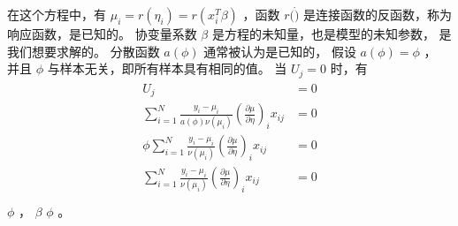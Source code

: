 \documentclass[letterpaper,10pt,english]{sphinxmanual}
\begin{document}
在这个方程中，有 \(\mu_i=r(\eta_i)=r(x_i^T \beta)\)
，函数 \(r(\dot)\) 是连接函数的反函数，称为响应函数，是已知的。
协变量系数 \(\beta\) 是方程的未知量，也是模型的未知参数，
是我们想要求解的。
分散函数 \(a(\phi)\) 通常被认为是已知的，
假设 \(a(\phi)=\phi\) ，
并且 \(\phi\) 与样本无关，即所有样本具有相同的值。
当 \(U_j=0\) 时，有
\begin{align}\label{equation:广义线性模型/estimate:广义线性模型/estimate:10}\!\begin{aligned}
U_j &= 0\\
\sum_{i=1}^N \frac{y_i-\mu_i}{a(\phi) \nu(\mu_i) }
\left ( \frac{\partial \mu}{\partial \eta} \right )_i x_{ij} &= 0\\
\phi \sum_{i=1}^N \frac{y_i-\mu_i}{ \nu(\mu_i) }
\left ( \frac{\partial \mu}{\partial \eta} \right )_i x_{ij} &= 0\\
\sum_{i=1}^N \frac{y_i-\mu_i}{ \nu(\mu_i) }
\left ( \frac{\partial \mu}{\partial \eta} \right )_i x_{ij} &= 0\\
\end{aligned}\end{align}
 \(\phi\) ，
 \(\beta\)  \(\phi\) 。
\end{document}

